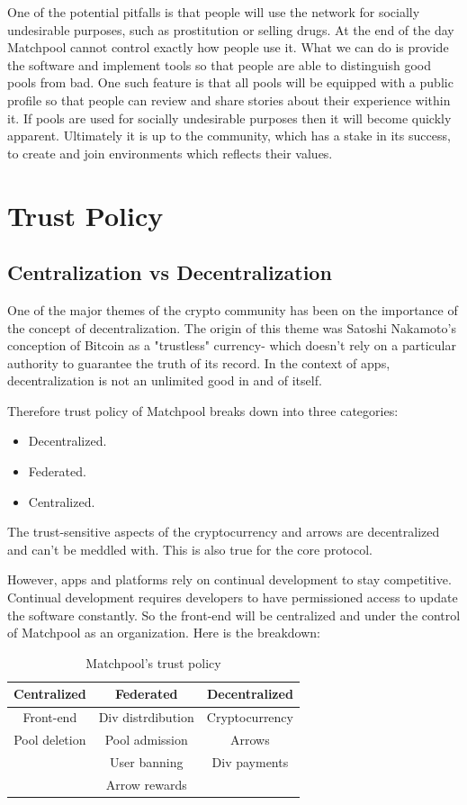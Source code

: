 \documentclass[a4paper]{article}
\begin{document}
One of the potential pitfalls is that people will use the network for socially undesirable purposes, such as prostitution or selling drugs. At the end of the day Matchpool cannot control exactly how people use it. What we can do is provide the software and implement tools so that people are able to distinguish good pools from bad. One such feature is that all pools will be equipped with a public profile so that people can review and share stories about their experience within it. If pools are used for socially undesirable purposes then it will become quickly apparent. Ultimately it is up to the community, which has a stake in its success, to create and join environments which reflects their values.

\section{Trust Policy}
\subsection{Centralization vs Decentralization}
One of the major themes of the crypto community has been on the importance of the concept of decentralization. The origin of this theme was Satoshi Nakamoto's conception of Bitcoin as a "trustless" currency- which doesn't rely on a particular authority to guarantee the truth of its record. In the context of apps, decentralization is not an unlimited good in and of itself.

Therefore trust policy of Matchpool breaks down into three categories:
\begin{itemize}
\item
Decentralized.
\item
Federated.
\item
Centralized.
\end{itemize}

The trust-sensitive aspects of the cryptocurrency and arrows are decentralized and can't be meddled with. This is also true for the core protocol.

However, apps and platforms rely on continual development to stay competitive. Continual development requires developers to have permissioned access to update the software constantly. So the front-end will be centralized and under the control of Matchpool as an organization. Here is the breakdown:

\begin{table}[!h]
\centering
\begin{tabular}{c|c|c}
Centralized & Federated & Decentralized \\\hline
Front-end & Div distrdibution & Cryptocurrency \\
Pool deletion & Pool admission & Arrows \\
& User banning & Div payments \\
& Arrow rewards &

\end{tabular}
\caption{\label{tab:widgets} Matchpool's trust policy }
\end{table}
\end{document}
